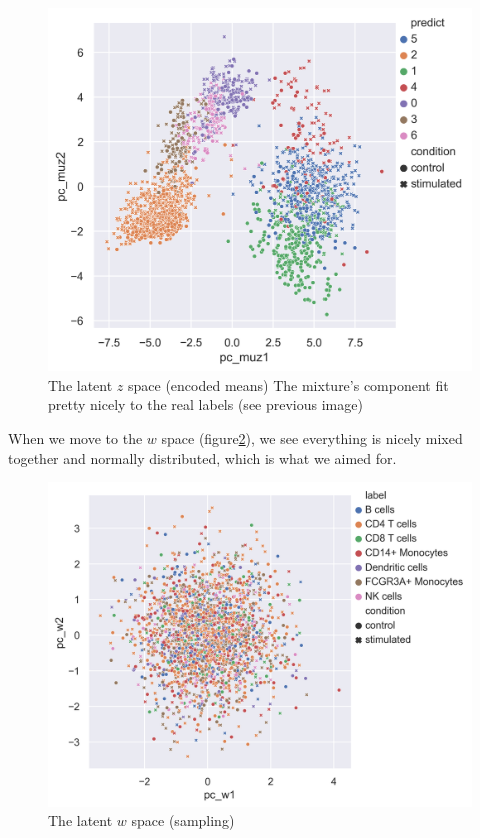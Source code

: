 \documentclass[11pt, a4paper]{report}
\theoremstyle{plain}
\theoremstyle{definition}
\theoremstyle{remark}
\begin{document}
\begin{figure}[h]
\centering
\includegraphics[width=1.1\textwidth]{images/Kang_super_val_mu_z_predict.png}
\caption{
The latent $z$ space (encoded means) The mixture's component fit pretty nicely
to the real labels (see previous image)
}
\label{fig:Kang_super_val_mu_z_predict}
\end{figure}


When we move to the $w$ space (figure\ref{fig:Kang_super_val_w}), we see everything
is nicely mixed together and normally distributed, which is what we aimed for.

\begin{figure}[h]
\centering
\includegraphics[width=1.1\textwidth]{images/Kang_super_val_w.png}
\caption{
The latent $w$ space (sampling)
}
\label{fig:Kang_super_val_w}
\end{figure}
\end{document}
